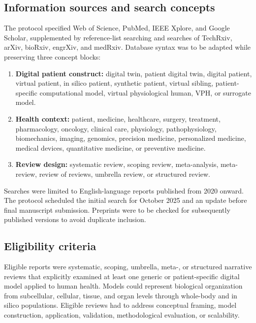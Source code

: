 \subsection{Information sources and search concepts}

The protocol specified Web of Science, PubMed, IEEE Xplore, and Google Scholar, supplemented by reference-list searching and searches of TechRxiv, arXiv, bioRxiv, engrXiv, and medRxiv. Database syntax was to be adapted while preserving three concept blocks:

\begin{enumerate}[leftmargin=*]
    \item \textbf{Digital patient construct:} digital twin, patient digital twin, digital patient, virtual patient, in silico patient, synthetic patient, virtual sibling, patient-specific computational model, virtual physiological human, VPH, or surrogate model.
    \item \textbf{Health context:} patient, medicine, healthcare, surgery, treatment, pharmacology, oncology, clinical care, physiology, pathophysiology, biomechanics, imaging, genomics, precision medicine, personalized medicine, medical devices, quantitative medicine, or preventive medicine.
    \item \textbf{Review design:} systematic review, scoping review, meta-analysis, meta-review, review of reviews, umbrella review, or structured review.
\end{enumerate}

Searches were limited to English-language reports published from 2020 onward. The protocol scheduled the initial search for October 2025 and an update before final manuscript submission. Preprints were to be checked for subsequently published versions to avoid duplicate inclusion.

\subsection{Eligibility criteria}

Eligible reports were systematic, scoping, umbrella, meta-, or structured narrative reviews that explicitly examined at least one generic or patient-specific digital model applied to human health. Models could represent biological organization from subcellular, cellular, tissue, and organ levels through whole-body and in silico populations. Eligible reviews had to address conceptual framing, model construction, application, validation, methodological evaluation, or scalability.

